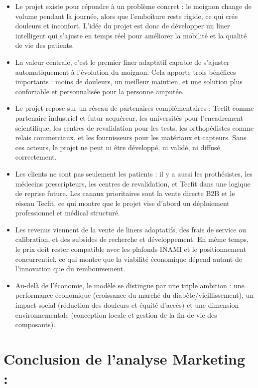 \begin{itemize}
    \item Le projet existe pour répondre à un problème concret : le moignon change de volume pendant la journée, alors que l’emboîture reste rigide, ce qui crée douleurs et inconfort. L’idée du projet est donc de développer un liner intelligent qui s’ajuste en temps réel pour améliorer la mobilité et la qualité de vie des patients.
    \item La valeur centrale, c’est le premier liner adaptatif capable de s’ajuster automatiquement à l’évolution du moignon. Cela apporte trois bénéfices importants : moins de douleurs, un meilleur maintien, et une solution plus confortable et personnalisée pour la personne amputée.
    \item Le projet repose sur un réseau de partenaires complémentaires : Tecfit comme partenaire industriel et futur acquéreur, les universités pour l’encadrement scientifique, les centres de revalidation pour les tests, les orthopédistes comme relais commerciaux, et les fournisseurs pour les matériaux et capteurs. Sans ces acteurs, le projet ne peut ni être développé, ni validé, ni diffusé correctement.
    \item Les clients ne sont pas seulement les patients : il y a aussi les prothésistes, les médecins prescripteurs, les centres de revalidation, et Tecfit dans une logique de reprise future. Les canaux prioritaires sont la vente directe B2B et le réseau Tecfit, ce qui montre que le projet vise d’abord un déploiement professionnel et médical structuré.
    \item Les revenus viennent de la vente de liners adaptatifs, des frais de service ou calibration, et des subsides de recherche et développement. En même temps, le prix doit rester compatible avec les plafonds INAMI et le positionnement concurrentiel, ce qui montre que la viabilité économique dépend autant de l’innovation que du remboursement.
    \item Au-delà de l'économie, le modèle se distingue par une triple ambition : une performance économique (croissance du marché du diabète/vieillissement), un impact social (réduction des douleurs et équité d'accès) et une dimension environnementale (conception locale et gestion de la fin de vie des composants).
\end{itemize}

\section{Conclusion de l'analyse Marketing :}


